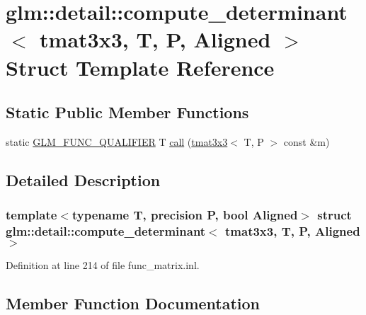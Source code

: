 \hypertarget{structglm_1_1detail_1_1compute__determinant_3_01tmat3x3_00_01_t_00_01_p_00_01_aligned_01_4}{}\section{glm\+::detail\+::compute\+\_\+determinant$<$ tmat3x3, T, P, Aligned $>$ Struct Template Reference}
\label{structglm_1_1detail_1_1compute__determinant_3_01tmat3x3_00_01_t_00_01_p_00_01_aligned_01_4}
\subsection*{Static Public Member Functions}
\begin{DoxyCompactItemize}
\item 
static \mbox{\hyperlink{setup_8hpp_a33fdea6f91c5f834105f7415e2a64407}{G\+L\+M\+\_\+\+F\+U\+N\+C\+\_\+\+Q\+U\+A\+L\+I\+F\+I\+ER}} T \mbox{\hyperlink{structglm_1_1detail_1_1compute__determinant_3_01tmat3x3_00_01_t_00_01_p_00_01_aligned_01_4_a0405cf47c521799f9581b5e9547a7882}{call}} (\mbox{\hyperlink{structglm_1_1tmat3x3}{tmat3x3}}$<$ T, P $>$ const \&m)
\end{DoxyCompactItemize}


\subsection{Detailed Description}
\subsubsection*{template$<$typename T, precision P, bool Aligned$>$\newline
struct glm\+::detail\+::compute\+\_\+determinant$<$ tmat3x3, T, P, Aligned $>$}



Definition at line 214 of file func\+\_\+matrix.\+inl.



\subsection{Member Function Documentation}
\mbox{\label{structglm_1_1detail_1_1compute__determinant_3_01tmat3x3_00_01_t_00_01_p_00_01_aligned_01_4_a0405cf47c521799f9581b5e9547a7882}} 
